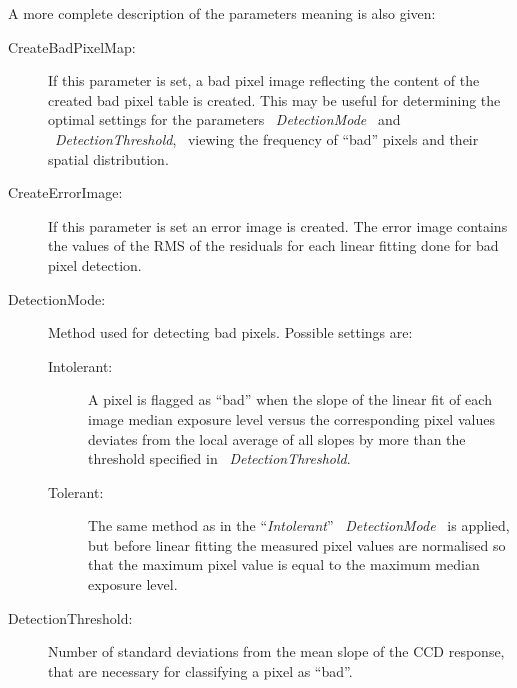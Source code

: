 A more complete description of the parameters meaning is also given:

\begin{description}

\item [CreateBadPixelMap:]  If this parameter is set, a
                        bad pixel image reflecting the content of the
                        created bad pixel table is created. This may
                        be useful for determining the optimal settings
                        for the parameters \ {\it DetectionMode} \ and 
                        \ {\it DetectionThreshold}, \ viewing the frequency
                        of ``bad'' pixels and their spatial distribution.

\item [CreateErrorImage:]  If this parameter is set an error image is 
                        created. The error image contains the values
                        of the RMS of the residuals for each linear
                        fitting done for bad pixel detection.

\item [DetectionMode:]  Method used for detecting bad pixels.
                        Possible settings are:

\begin{description}

  \item [Intolerant:]   A pixel is flagged as ``bad'' when the slope of 
                        the linear fit of each image median exposure level 
                        versus the corresponding pixel values deviates from 
                        the local average of all slopes by more than the 
                        threshold specified in \ {\it DetectionThreshold}.

  \item [Tolerant:]     The same method as in the ``{\it Intolerant}''
                        \ {\it DetectionMode} \ is applied, but before
                        linear fitting the measured pixel values are normalised
                        so that the maximum pixel value is equal to the
                        maximum median exposure level. 

\end{description}

\item [DetectionThreshold:] Number of standard deviations from the mean 
                        slope of the CCD response, that are necessary for 
                        classifying a pixel as ``bad''. 

\end{description}

